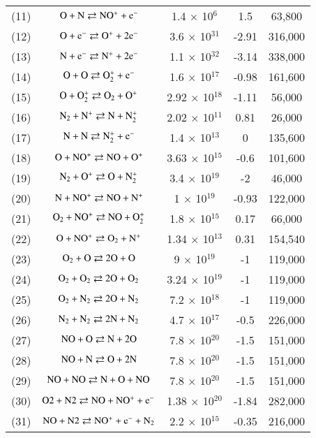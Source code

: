 \documentclass{warpdoc}
\begin{document}
\begin{table}[t]
\begin{center}
\begin{threeparttable}
\begin{tabular}{ccccc}
(11) & $\rm O + N \rightleftarrows NO^{+}+e^{-}$ & 1.4 $\times$ 10$^{6}$ & 1.5 & 63,800 \\
(12) & $\rm O + e^- \rightleftarrows O^++2e^-$ & 3.6 $\times$ 10$^{31}$ & -2.91 & 316,000 \\
(13) & $\rm N + e^- \rightleftarrows N^++2e^-$ & 1.1 $\times$ 10$^{32}$ & -3.14 & 338,000 \\
(14) & $\rm O + O \rightleftarrows O_2^{+}+e^-$ & 1.6 $\times$ 10$^{17}$ & -0.98 & 161,600 \\
(15) & $\rm O + O_2^+ \rightleftarrows O_2+O^+$ & 2.92 $\times$ 10$^{18}$ & -1.11 & 56,000 \\
(16) & $\rm N_2 + N^+ \rightleftarrows N+N_2^{+}$ & 2.02 $\times$ 10$^{11}$ & 0.81 & 26,000 \\
(17) & $\rm N + N \rightleftarrows N_2^{+} + e^-$ & 1.4 $\times$ 10$^{13}$ & 0 & 135,600 \\
(18) & $\rm O + NO^+ \rightleftarrows NO + O^+$ & 3.63 $\times$ 10$^{15}$ & -0.6 & 101,600 \\
(19) & $\rm N_2 + O^+ \rightleftarrows O + N_2^{+}$ & 3.4 $\times$ 10$^{19}$ & -2 & 46,000 \\
(20) & $\rm N + NO^+ \rightleftarrows NO + N^+$ & 1 $\times$ 10$^{19}$ & -0.93 & 122,000 \\
(21) & $\rm O_2 + NO^+ \rightleftarrows NO + O_2^{+}$ & 1.8 $\times$ 10$^{15}$ & 0.17 & 66,000 \\
(22) & $\rm O + NO^+ \rightleftarrows O_2 + N^+$ & 1.34 $\times$ 10$^{13}$ & 0.31 & 154,540 \\
(23) & $\rm O_2 + O \rightleftarrows 2O + O$ & 9 $\times$ 10$^{19}$ & -1 & 119,000 \\
(24) & $\rm O_2 + O_2 \rightleftarrows 2O + O_2$ & 3.24 $\times$ 10$^{19}$ & -1 & 119,000 \\
(25) & $\rm O_2 + N_2 \rightleftarrows 2O + N_2$ & 7.2 $\times$ 10$^{18}$ & -1 & 119,000 \\
(26) & $\rm N_2 + N_2 \rightleftarrows 2N + N_2$ & 4.7 $\times$ 10$^{17}$ & -0.5 & 226,000 \\
(27) & $\rm NO + O \rightleftarrows N + 2O$ & 7.8 $\times$ 10$^{20}$ & -1.5 & 151,000 \\
(28) & $\rm NO + N \rightleftarrows O + 2N$ & 7.8 $\times$ 10$^{20}$ & -1.5 & 151,000 \\
(29) & $\rm NO + NO \rightleftarrows N + O + NO$ & 7.8 $\times$ 10$^{20}$ & -1.5 & 151,000 \\
(30) & $\rm O2 + N2 \rightleftarrows NO + NO^+ + e^-$ & 1.38 $\times$ 10$^{20}$ & -1.84 & 282,000 \\
(31) & $\rm NO + N2 \rightleftarrows NO^+ + e^- + N_2$ & 2.2 $\times$ 10$^{15}$ & -0.35 & 216,000 \\
\bottomrule
\end{tabular}
\label{tab:dunn-kang}
\end{threeparttable}
\end{center}
\end{table}
%
\end{document}
